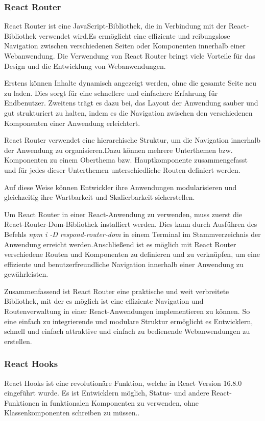 \subsubsection{React Router}
React Router ist eine JavaScript-Bibliothek, die in Verbindung mit der React-Bibliothek verwendet wird.Es ermöglicht eine effiziente und reibungslose Navigation zwischen verschiedenen Seiten oder Komponenten innerhalb einer Webanwendung.
Die Verwendung von React Router bringt viele Vorteile für das Design und die Entwicklung von Webanwendungen.

Erstens können Inhalte dynamisch angezeigt werden, ohne die gesamte Seite neu zu laden. Dies sorgt für eine schnellere und einfachere Erfahrung für Endbenutzer. Zweitens trägt es dazu bei, das Layout der Anwendung sauber und gut strukturiert zu halten, indem es die Navigation zwischen den verschiedenen Komponenten einer Anwendung erleichtert.

React Router verwendet eine hierarchische Struktur, um die Navigation innerhalb der Anwendung zu organisieren.Dazu können mehrere Unterthemen bzw. Komponenten zu einem Oberthema bzw. Hauptkomponente zusammengefasst und für jedes dieser Unterthemen unterschiedliche Routen definiert werden.

Auf diese Weise können Entwickler ihre Anwendungen modularisieren und gleichzeitig ihre Wartbarkeit und Skalierbarkeit sicherstellen.

Um React Router in einer React-Anwendung zu verwenden, muss zuerst die React-Router-Dom-Bibliothek installiert werden. Dies kann durch Ausführen des Befehls \emph{npm i -D respond-router-dom} in einem Terminal im Stammverzeichnis der Anwendung erreicht werden.Anschließend ist es möglich mit React Router verschiedene Routen und Komponenten zu definieren und zu verknüpfen, um eine effiziente und benutzerfreundliche Navigation innerhalb einer Anwendung zu gewährleisten.

Zusammenfassend ist React Router eine praktische und weit verbreitete Bibliothek, mit der es möglich ist eine effiziente Navigation und Routenverwaltung in einer React-Anwendungen implementieren zu können. So eine einfach zu integrierende und modulare Struktur ermöglicht es Entwicklern, schnell und einfach attraktive und einfach zu bedienende Webanwendungen zu erstellen. \cite{react-router}

\subsubsection{React Hooks}
React Hooks ist eine revolutionäre Funktion, welche in React Version 16.8.0 eingeführt wurde. Es ist Entwicklern möglich, Status- und andere React-Funktionen in funktionalen Komponenten zu verwenden, ohne Klassenkomponenten schreiben zu müssen..

